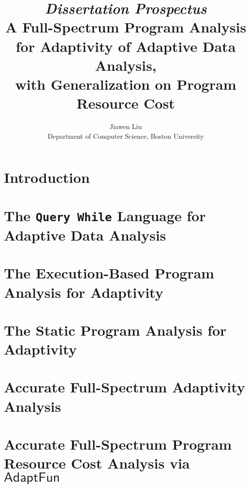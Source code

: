 \documentclass[a4paper,11pt]{article}
\newcommand{\THESYSTEM}{\textsf{AdaptFun}}
\begin{document}
\title{{\em Dissertation Prospectus}
\\ {A Full-Spectrum Program Analysis for Adaptivity of Adaptive Data Analysis}, 
\\ with Generalization on Program Resource Cost}

\author{Jiawen Liu\\ Department of Computer Science, Boston University}
\maketitle
\begin{abstract}

\end{abstract}

\clearpage
\tableofcontents{}

\clearpage
\section{Introduction}
\label{sec:introduction}


\section{The {\tt Query While} Language for Adaptive Data Analysis}
\label{sec:language}


\section{The Execution-Based Program Analysis for Adaptivity}
\label{sec:dynamic}


\section{The Static Program Analysis for Adaptivity}
\label{sec:static}



\section{Accurate Full-Spectrum Adaptivity Analysis}
\label{sec:furthers}


\section{Accurate Full-Spectrum Program Resource Cost Analysis via $\THESYSTEM$}
\label{sec:generalization}

\end{document}
